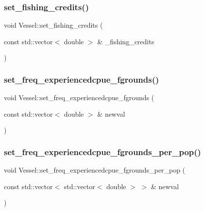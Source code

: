 \subsubsection{\texorpdfstring{set\_fishing\_credits()}{set\_fishing\_credits()}}
{\footnotesize\ttfamily void Vessel\+::set\+\_\+fishing\+\_\+credits (\begin{DoxyParamCaption}\item[{const std\+::vector$<$ double $>$ \&}]{\+\_\+fishing\+\_\+credits }\end{DoxyParamCaption})}

\mbox{\label{class_vessel_ab9b55646c702eaa80656d129c6134da1}} 
\subsubsection{\texorpdfstring{set\_freq\_experiencedcpue\_fgrounds()}{set\_freq\_experiencedcpue\_fgrounds()}}
{\footnotesize\ttfamily void Vessel\+::set\+\_\+freq\+\_\+experiencedcpue\+\_\+fgrounds (\begin{DoxyParamCaption}\item[{const std\+::vector$<$ double $>$ \&}]{newval }\end{DoxyParamCaption})}

\mbox{\label{class_vessel_a53e54a8e1875755e4cdcaefb5c852b7c}} 
\subsubsection{\texorpdfstring{set\_freq\_experiencedcpue\_fgrounds\_per\_pop()}{set\_freq\_experiencedcpue\_fgrounds\_per\_pop()}}
{\footnotesize\ttfamily void Vessel\+::set\+\_\+freq\+\_\+experiencedcpue\+\_\+fgrounds\+\_\+per\+\_\+pop (\begin{DoxyParamCaption}\item[{const std\+::vector$<$ std\+::vector$<$ double $>$ $>$ \&}]{newval }\end{DoxyParamCaption})}

\mbox{\label{class_vessel_ab28d7d074d98400ba6a705114bc9c966}} 
